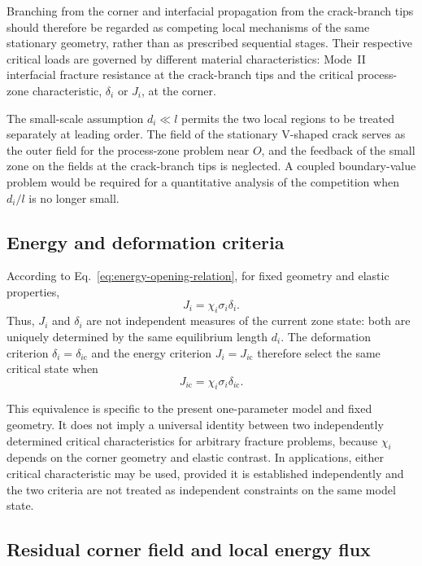 Branching from the corner and interfacial propagation from the crack-branch tips
should therefore be regarded as competing local mechanisms of the same
stationary geometry, rather than as prescribed sequential stages. Their
respective critical loads are governed by different material
characteristics: Mode~II interfacial fracture resistance at the crack-branch tips
and the critical process-zone characteristic, $\delta_i$ or $J_i$, at
the corner.

The small-scale assumption $d_i\ll l$ permits the two local regions to be
treated separately at leading order. The field of the stationary V-shaped
crack serves as the outer field for the process-zone problem near $O$, and
the feedback of the small zone on the fields at the crack-branch tips is
neglected. A coupled boundary-value problem would be required for a
quantitative analysis of the competition when $d_i/l$ is no longer small.

\subsection{Energy and deformation criteria}
\label{subsec:discussion-criteria}

According to Eq.~\eqref{eq:energy-opening-relation}, for fixed geometry
and elastic properties,
\begin{equation*}
  J_i=\chi_i\sigma_i\delta_i.
\end{equation*}
Thus, $J_i$ and $\delta_i$ are not independent measures of the current
zone state: both are uniquely determined by the same equilibrium length
$d_i$. The deformation criterion
$\delta_i=\delta_{i\mathrm{c}}$ and the energy criterion
$J_i=J_{i\mathrm{c}}$ therefore select the same critical state when
\begin{equation*}
  J_{i\mathrm{c}}
  =\chi_i\sigma_i\delta_{i\mathrm{c}}.
\end{equation*}

This equivalence is specific to the present one-parameter model and fixed
geometry. It does not imply a universal identity between two independently
determined critical characteristics for arbitrary fracture problems, because
$\chi_i$ depends on the corner geometry and elastic contrast. In
applications, either critical characteristic may be used, provided it is
established independently and the two criteria are not treated as
independent constraints on the same model state.

\subsection{Residual corner field and local energy flux}
\label{subsec:discussion-flux}

